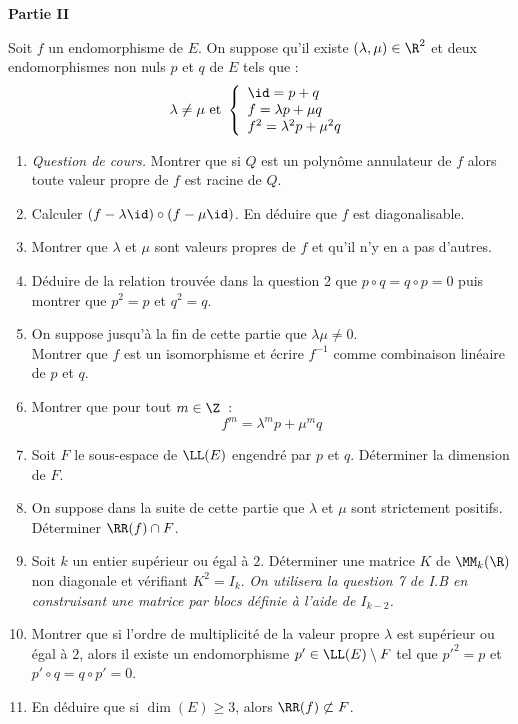 \documentclass[twoside,french,11pt]{VcCours}
\renewcommand{\l}{\LL(E)}
\begin{document}
\vskip 2cm
\centerline{\bf Partie II}
\bigskip
\noindent Soit $f$ un endomorphisme de $E$. On suppose qu'il existe $(\lambda,\mu) \in \R^2$ et deux endomorphismes non nuls $p$ et $q$ de $E$ tels que :
$$
\lambda \not= \mu \ \hbox{et} \ 
\left\{
\begin{array}{l}
\id = p+ q \\
f = \lambda p + \mu q \\
f^2 = \lambda^2 p + \mu^2 q
\end{array}
\right.
$$
\begin{enumerate}
\item \textit{Question de cours.} Montrer que si $Q$ est un polynôme annulateur de $f$ alors toute valeur propre de $f$ est racine de $Q$.
\item Calculer $(f-\lambda \id) \circ (f-\mu \id)$. En déduire que $f$ est diagonalisable.
\item Montrer que $\lambda$ et $\mu$ sont valeurs propres de $f$ et qu'il n'y en a pas d'autres.
\item Déduire de la relation trouvée dans la question 2 que $p \circ q = q \circ p =0$ puis montrer que $p^2=p$ et $q^2=q$.
\item On suppose jusqu'à la fin de cette partie que $\lambda \mu \not= 0$.\\
Montrer que $f$ est un isomorphisme et écrire $f^{-1}$ comme combinaison linéaire de $p$ et $q$.
\item Montrer que pour tout $m \in \Z$~:
$$
f^m = \lambda^m p + \mu^m q
$$
\item  Soit $F$ le sous-espace de $\l$ engendré par $p$ et $q$. Déterminer la dimension de $F$.
\item On suppose dans la suite de cette partie que $\lambda$ et $\mu$ sont strictement positifs. Déterminer $\RR(f) \cap F$.
\item Soit $k$ un entier supérieur ou égal à $2$. Déterminer une matrice $K$ de $\MM_k(\R)$ non diagonale et vérifiant $K^2=I_k$. \textit{On utilisera la question 7 de I.B en construisant une matrice par blocs définie à l'aide de $I_{k-2}$.}
\item Montrer que si l'ordre de multiplicité de la valeur propre $\lambda$ est supérieur ou égal à $2$, alors il existe un endomorphisme $p' \in \l \setminus F$ tel que ${p'}^2=p$ et $p' \circ q = q \circ p' = 0$.
\item En déduire que si $\dim(E) \ge 3$, alors $\RR(f) \not\subset F$.
\end{enumerate}
\end{document}
